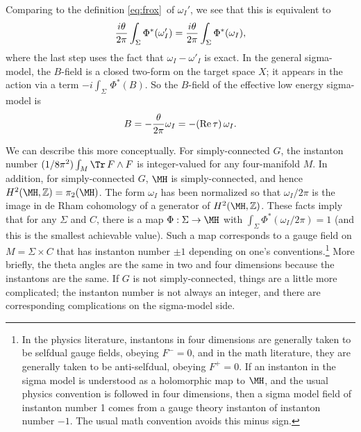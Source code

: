 Comparing to the definition \eqref{eq:frox}\ of $\omega_I'$, we see that
this is equivalent to %
\setcounter{equation}{17}
\begin{equation}\label{eq:zinok}
{i\theta\over
2\pi}\int_\Sigma\Phi^*(\omega'_{I})={i\theta\over 2\pi}\int_\Sigma
\Phi^*(\omega_I),
\end{equation}
 where the last step uses the fact that
$\omega_{I}-\omega'_{I}$ is exact.  In the general sigma-model,
the $B$-field is a closed two-form on the target space $X$; it
appears in the action via a term $-i\int_\Sigma\,\Phi^*(B)$. So
the $B$-field of the effective low energy sigma-model is
\setcounter{equation}{18}
\begin{equation}\label{eq:palooka}
B=-{\theta\over 2\pi}\omega_I=-({\rm
Re}\,\tau)\,\omega_I.
\end{equation}

We can describe this more conceptually.  For simply-connected $G$,
the instanton number $(1/8\pi^2)\int_M \Tr\,F\wedge F$ is
integer-valued for any four-manifold $M$.  In addition, for
simply-connected $G$, $\MH$ is simply-connected, and hence
$H^2(\MH,\Bbb{Z})=\pi_2(\MH)$.  The form $\omega_I$ has been
normalized so that $\omega_I/2\pi$ is the image in de Rham
cohomology of a generator of $H^2(\MH,\Bbb{Z})$. These facts imply
that for any $\Sigma$ and $C$, there is a map $\Phi:\Sigma\to \MH$
with $\int_\Sigma\Phi^*(\omega_I/2\pi)=1$ (and this is the smallest
achievable value).  Such a map corresponds to a gauge field on
$M=\Sigma\times C$ that has instanton number $\pm 1$ depending on
one's conventions.\footnote{In the physics literature, instantons in
four dimensions are generally taken to be selfdual gauge fields,
obeying $F^-=0$, and in the math literature, they are generally
taken to be anti-selfdual, obeying $F^+=0$.  If an instanton in
the sigma model is understood as a holomorphic map to $\MH$, and
the usual physics convention is followed in four dimensions, then
a sigma model field of instanton number 1 comes from a gauge
theory instanton of instanton number $-1$.  The usual math
convention  avoids this minus sign.} More briefly, the theta
angles are the same in two and four dimensions because the
instantons are the same. If $G$ is not simply-connected, things
are a little more complicated; the instanton number is not always
an integer, and there are corresponding complications on the
sigma-model side.
